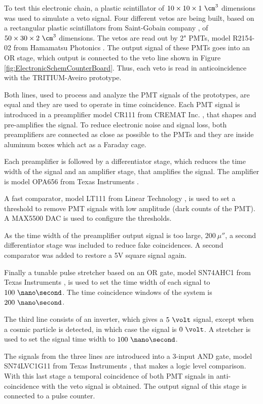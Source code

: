 \begin{enumerate}
To test this electronic chain, a plastic scintillator of $10 \times 10 \times 1~\cm^3$ dimensions was used to simulate a veto signal. Four different vetos are being built, based on a rectangular plastic scintillators from Saint-Gobain company \cite{VetoAveiro}, of $50\times 30 \times 2~\cm^3$ dimensions. The vetos are read out by $2$" PMTs, model R2154-02 from Hamamatsu Photonics \cite{DataSheetPMTsAveiro}. The output signal of these PMTs goes into an OR stage, which output is connected to the veto line shown in Figure \ref{fig:ElectronicSchemCounterBoard}. Thus, each veto is read in anticoincidence with the TRITIUM-Aveiro prototype.

Both lines, used to process and analyze the PMT signals of the prototypes, are equal and they are used to operate in time coincidence. Each PMT signal is introduced in a preamplifier model CR111 from CREMAT Inc. \cite{CREMATPreAmplifierDataSheet}, that shapes and pre-amplifies the signal. To reduce electronic noise and signal loss, both preamplifiers are connected as close as possible to the PMTs and they are inside aluminum boxes which act as a Faraday cage.

Each preamplifier is followed by a differentiator stage, which reduces the time width of the signal and an amplifier stage, that amplifies the signal. The amplifier is model OPA656 from Texas Instruments \cite{OPA656}. 

A fast comparator, model LT111 from Linear Technology \cite{LT111}, is used to set a threshold to remove PMT signals with low amplitude (dark counts of the PMT). A MAX5500 DAC is used to configure the thresholds.

As the time width of the preamplifier output signal is too large, $200~\mu\second$, a second differentiator stage was included to reduce fake coincidences. A second comparator was added to restore a 5V square signal again.

Finally a tunable pulse stretcher based on an OR gate, model SN74AHC1 from Texas Instruments \cite{Stretcher}, is used to set the time width of each signal to $100~\nano\second$. The time coincidence windows of the system is $200~\nano\second$.

The third line consists of an inverter, which gives a $5~\volt$ signal, except when a cosmic particle is detected, in which case the signal is $0~\volt$. A stretcher is used to set the signal time width to $100~\nano\second$.

The signals from the three lines are introduced into a 3-input AND gate, model SN74LVC1G11 from Texas Instruments \cite{ANDGate}, that makes a logic level comparison. With this last stage a temporal coincidence of both PMT signals in anti-coincidence with the veto signal is obtained. The output signal of this stage is connected to a pulse counter. 


\end{enumerate}
